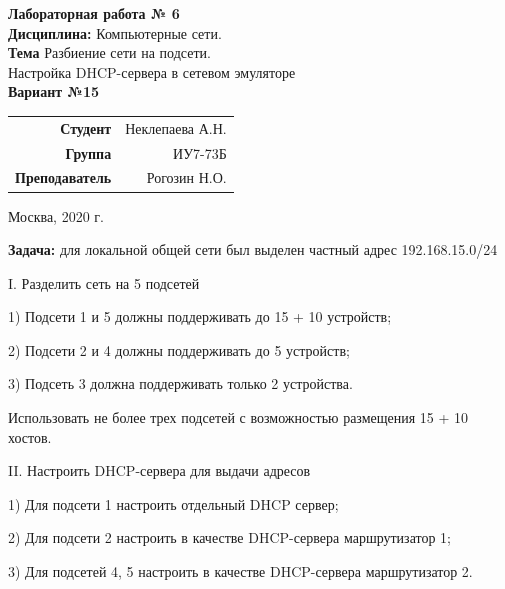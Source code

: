 \documentclass[a4paper,14pt]{extreport} %
\begin{document}
\begin{titlepage}
	\vspace{2cm}
	
	\begin{center}
		\textbf{Лабораторная работа № 6} \\
		\textbf{Дисциплина:}  Компьютерные сети.  \\
		\textbf{Тема} 
		Разбиение сети на подсети. \\ Настройка DHCP-сервера в сетевом  эмуляторе\\
		\textbf{Вариант №15} \\
	\end{center}

    \vspace{4cm}
    
	\begin{flushright}
		\begin{tabular}{rr}
			\textbf{Студент} & Неклепаева А.Н. \\
			\textbf{Группа} & ИУ7-73Б \\
			\textbf{Преподаватель} & Рогозин Н.О.   \\
		\end{tabular}
	\end{flushright}
	
	\vspace{7cm}
	
	\begin{center}
		Москва, 2020 г.
	\end{center}
	
\end{titlepage}

\textbf{Задача:} для локальной общей сети был выделен частный адрес 192.168.15.0/24

I. Разделить сеть на 5 подсетей

1) Подсети 1 и 5 должны поддерживать до 15 + 10 устройств;

2) Подсети 2 и 4 должны поддерживать до 5 устройств;

3) Подсеть 3 должна поддерживать только 2 устройства.

Использовать не более трех подсетей с возможностью размещения 15 +
10 хостов.

II. Настроить DHCP-сервера для выдачи адресов

1) Для подсети 1 настроить отдельный DHCP сервер;

2) Для подсети 2 настроить в качестве DHCP-сервера маршрутизатор 1;

3) Для подсетей 4, 5 настроить в качестве DHCP-сервера маршрутизатор 2.
\end{document}
